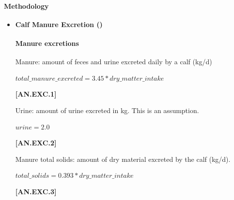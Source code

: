 \begin{refsection}
    
    \paragraph{Methodology}

    \begin{itemize}
        \item \textbf{Calf Manure Excretion ()}

\paragraph{Manure excretions}
\vspace{-0.25cm}

Manure: amount of feces and urine excreted daily by a calf (kg/d)
        \vspace{0.5cm}        
    
    \begin{center}
        \(total\_manure\_excreted = 3.45 * dry\_matter\_intake\)
    \end{center}
        \vspace{0.5cm} 
    
            {\raggedleft \textbf{[AN.EXC.1]}\par}
            \vspace{0.5cm} 
 
            
Urine: amount of urine excreted in kg. This is an assumption. 
        \vspace{0.5cm}        
    
    \begin{center}
        \(urine = 2.0\)
    \end{center}
        \vspace{0.5cm} 
    
            {\raggedleft \textbf{[AN.EXC.2]}\par}
            \vspace{0.5cm} 

Manure total solids: amount of dry material excreted by the calf (kg/d). 
        \vspace{0.5cm}  
    
    \begin{center}
        \(total\_solids = 0.393 * dry\_matter\_intake\)
    \end{center}
        \vspace{0.5cm} 
    
            {\raggedleft \textbf{[AN.EXC.3]}\par}
            \vspace{0.5cm} 
            

\end{itemize}
\end{refsection}
